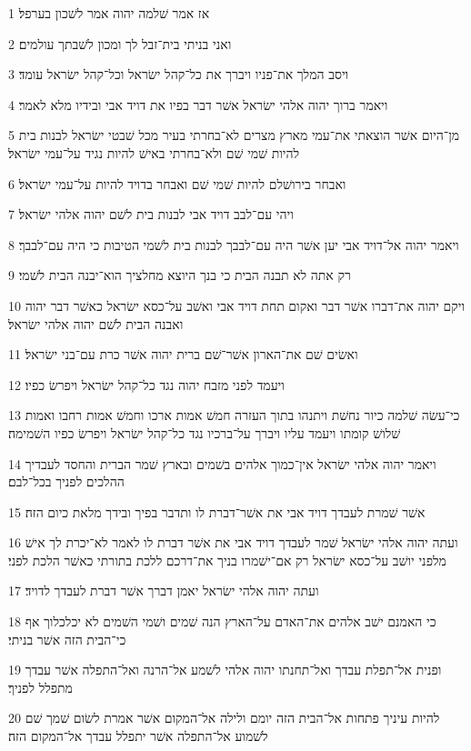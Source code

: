 \par 1 אז אמר שׁלמה יהוה אמר לשׁכון בערפל׃
\par 2 ואני בניתי בית־זבל לך ומכון לשׁבתך עולמים׃
\par 3 ויסב המלך את־פניו ויברך את כל־קהל ישׂראל וכל־קהל ישׂראל עומד׃
\par 4 ויאמר ברוך יהוה אלהי ישׂראל אשׁר דבר בפיו את דויד אבי ובידיו מלא לאמר׃
\par 5 מן־היום אשׁר הוצאתי את־עמי מארץ מצרים לא־בחרתי בעיר מכל שׁבטי ישׂראל לבנות בית להיות שׁמי שׁם ולא־בחרתי באישׁ להיות נגיד על־עמי ישׂראל׃
\par 6 ואבחר בירושׁלם להיות שׁמי שׁם ואבחר בדויד להיות על־עמי ישׂראל׃
\par 7 ויהי עם־לבב דויד אבי לבנות בית לשׁם יהוה אלהי ישׂראל׃
\par 8 ויאמר יהוה אל־דויד אבי יען אשׁר היה עם־לבבך לבנות בית לשׁמי הטיבות כי היה עם־לבבך׃
\par 9 רק אתה לא תבנה הבית כי בנך היוצא מחלציך הוא־יבנה הבית לשׁמי׃
\par 10 ויקם יהוה את־דברו אשׁר דבר ואקום תחת דויד אבי ואשׁב על־כסא ישׂראל כאשׁר דבר יהוה ואבנה הבית לשׁם יהוה אלהי ישׂראל׃
\par 11 ואשׂים שׁם את־הארון אשׁר־שׁם ברית יהוה אשׁר כרת עם־בני ישׂראל׃
\par 12 ויעמד לפני מזבח יהוה נגד כל־קהל ישׂראל ויפרשׂ כפיו׃
\par 13 כי־עשׂה שׁלמה כיור נחשׁת ויתנהו בתוך העזרה חמשׁ אמות ארכו וחמשׁ אמות רחבו ואמות שׁלושׁ קומתו ויעמד עליו ויברך על־ברכיו נגד כל־קהל ישׂראל ויפרשׂ כפיו השׁמימה׃
\par 14 ויאמר יהוה אלהי ישׂראל אין־כמוך אלהים בשׁמים ובארץ שׁמר הברית והחסד לעבדיך ההלכים לפניך בכל־לבם׃
\par 15 אשׁר שׁמרת לעבדך דויד אבי את אשׁר־דברת לו ותדבר בפיך ובידך מלאת כיום הזה׃
\par 16 ועתה יהוה אלהי ישׂראל שׁמר לעבדך דויד אבי את אשׁר דברת לו לאמר לא־יכרת לך אישׁ מלפני יושׁב על־כסא ישׂראל רק אם־ישׁמרו בניך את־דרכם ללכת בתורתי כאשׁר הלכת לפני׃
\par 17 ועתה יהוה אלהי ישׂראל יאמן דברך אשׁר דברת לעבדך לדויד׃
\par 18 כי האמנם ישׁב אלהים את־האדם על־הארץ הנה שׁמים ושׁמי השׁמים לא יכלכלוך אף כי־הבית הזה אשׁר בניתי׃
\par 19 ופנית אל־תפלת עבדך ואל־תחנתו יהוה אלהי לשׁמע אל־הרנה ואל־התפלה אשׁר עבדך מתפלל לפניך׃
\par 20 להיות עיניך פתחות אל־הבית הזה יומם ולילה אל־המקום אשׁר אמרת לשׂום שׁמך שׁם לשׁמוע אל־התפלה אשׁר יתפלל עבדך אל־המקום הזה׃

